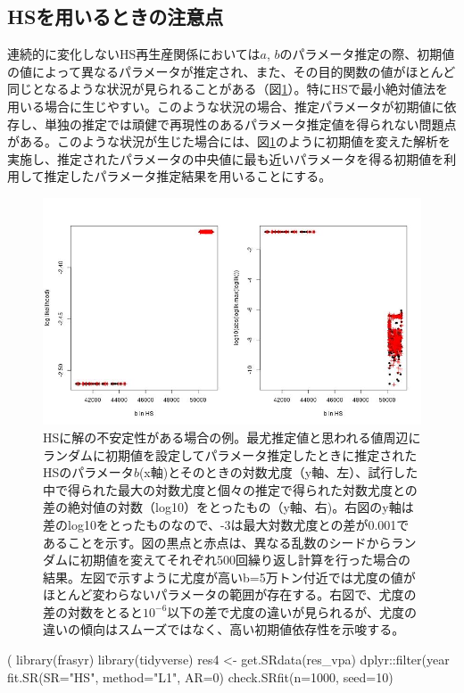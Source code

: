 \documentclass[11pt]{jsarticle}
\begin{document}
\subsection{HSを用いるときの注意点\label{hsissue}}
連続的に変化しないHS再生産関係においては$a$, $b$のパラメータ推定の際、初期値の値によって異なるパラメータが推定され、また、その目的関数の値がほとんど同じとなるような状況が見られることがある（図\ref{fig_hsissue}）。特にHSで最小絶対値法を用いる場合に生じやすい。このような状況の場合、推定パラメータが初期値に依存し、単独の推定では頑健で再現性のあるパラメータ推定値を得られない問題点がある。このような状況が生じた場合には、図\ref{fig_hsissue}のように初期値を変えた解析を実施し、推定されたパラメータの中央値に最も近いパラメータを得る初期値を利用して推定したパラメータ推定結果を用いることにする。

\begin{figure}[t]
  \includegraphics[width=13cm]{example_HS_issue.jpg}
  \caption{HSに解の不安定性がある場合の例。最尤推定値と思われる値周辺にランダムに初期値を設定してパラメータ推定したときに推定されたHSのパラメータ$b$(x軸)とそのときの対数尤度（y軸、左）、試行した中で得られた最大の対数尤度と個々の推定で得られた対数尤度との差の絶対値の対数（log10）をとったもの（y軸、右)。右図のy軸は差のlog10をとったものなので、-3は最大対数尤度との差が0.001であることを示す。図の黒点と赤点は、異なる乱数のシードからランダムに初期値を変えてそれぞれ500回繰り返し計算を行った場合の結果。左図で示すように尤度が高いb=5万トン付近では尤度の値がほとんど変わらないパラメータの範囲が存在する。右図で、尤度の差の対数をとると$10^{-6}$以下の差で尤度の違いが見られるが、尤度の違いの傾向はスムーズではなく、高い初期値依存性を示唆する。}
  \label{fig_hsissue}
\end{figure}

\if (
library(frasyr)
library(tidyverse)
res4 <- get.SRdata(res_vpa) %
  dplyr::filter(year%
  fit.SR(SR="HS", method="L1", AR=0) %
   check.SRfit(n=1000, seed=10)
\end{document}
